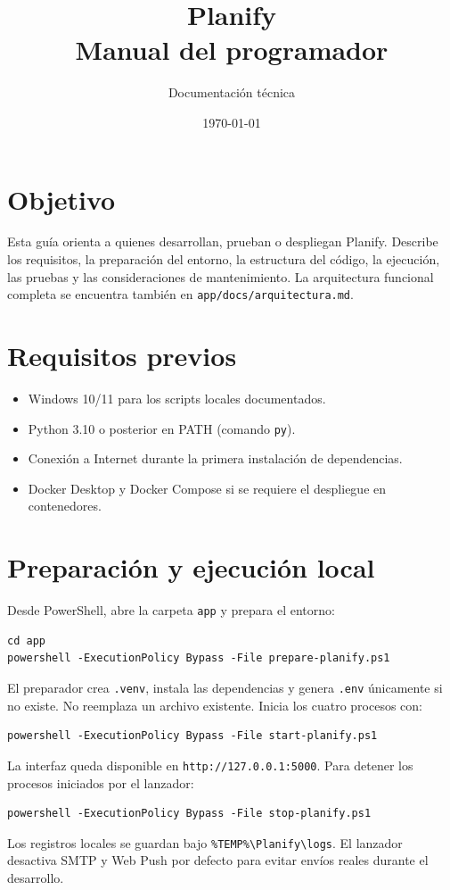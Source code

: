 \documentclass[12pt,a4paper]{article}
\title{Planify\\Manual del programador}
\author{Documentación técnica}
\date{\today}
\begin{document}
\maketitle
\tableofcontents
\newpage

\section{Objetivo}
Esta guía orienta a quienes desarrollan, prueban o despliegan Planify. Describe los requisitos, la preparación del entorno, la estructura del código, la ejecución, las pruebas y las consideraciones de mantenimiento. La arquitectura funcional completa se encuentra también en \texttt{app/docs/arquitectura.md}.

\section{Requisitos previos}
\begin{itemize}
  \item Windows 10/11 para los scripts locales documentados.
  \item Python 3.10 o posterior en PATH (comando \texttt{py}).
  \item Conexión a Internet durante la primera instalación de dependencias.
  \item Docker Desktop y Docker Compose si se requiere el despliegue en contenedores.
\end{itemize}

\section{Preparación y ejecución local}
Desde PowerShell, abre la carpeta \texttt{app} y prepara el entorno:
\begin{lstlisting}
cd app
powershell -ExecutionPolicy Bypass -File prepare-planify.ps1
\end{lstlisting}
El preparador crea \texttt{.venv}, instala las dependencias y genera \texttt{.env} únicamente si no existe. No reemplaza un archivo existente. Inicia los cuatro procesos con:
\begin{lstlisting}
powershell -ExecutionPolicy Bypass -File start-planify.ps1
\end{lstlisting}
La interfaz queda disponible en \texttt{http://127.0.0.1:5000}. Para detener los procesos iniciados por el lanzador:
\begin{lstlisting}
powershell -ExecutionPolicy Bypass -File stop-planify.ps1
\end{lstlisting}
Los registros locales se guardan bajo \texttt{\%TEMP\%\textbackslash Planify\textbackslash logs}. El lanzador desactiva SMTP y Web Push por defecto para evitar envíos reales durante el desarrollo.
\end{document}
